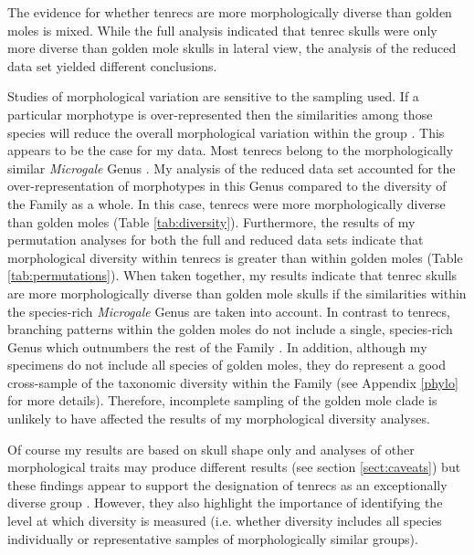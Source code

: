 	

	The evidence for whether tenrecs are more morphologically diverse than golden moles is mixed. While the full analysis indicated that tenrec skulls were only more diverse than golden mole skulls in lateral view, the analysis of the reduced data set yielded different conclusions.
	
	Studies of morphological variation are sensitive to the sampling used. If a particular morphotype is over-represented then the similarities among those species will reduce the overall morphological variation within the group \citep{Foote1991}. This appears to be the case for my data. Most tenrecs belong to the morphologically similar \textit{Microgale} Genus \citep{Jenkins2003}. My analysis of the reduced data set accounted for the over-representation of morphotypes in this Genus compared to the diversity of the Family as a whole. In this case, tenrecs were more morphologically diverse than golden moles (Table \ref{tab:diversity}). Furthermore, the results of my permutation analyses for both the full and reduced data sets indicate that morphological diversity within tenrecs is greater than within golden moles (Table \ref{tab:permutations}).
	When taken together, my results indicate that tenrec skulls are more morphologically diverse than golden mole skulls if the similarities within the species-rich \textit{Microgale} Genus are taken into account. 
	In contrast to tenrecs, branching patterns within the golden moles do not include a single, species-rich Genus which outnumbers the rest of the Family \citep{Asher2010}. In addition, although my specimens do not include all species of golden moles, they do represent a good cross-sample of the taxonomic diversity within the Family (see Appendix \ref{phylo} for more details). Therefore, incomplete sampling of the golden mole clade is unlikely to have affected the results of my morphological diversity analyses.
	
	Of course my results are based on skull shape only and analyses of other morphological traits may produce different results (see section \ref{sect:caveats}) but
	these findings appear to support the designation of tenrecs as an exceptionally diverse group \citep{Olson2013, Eisenberg1969}. However, they also highlight the importance of identifying the level at which diversity is measured (i.e. whether diversity includes all species individually or representative samples of morphologically similar groups). 
	
	

